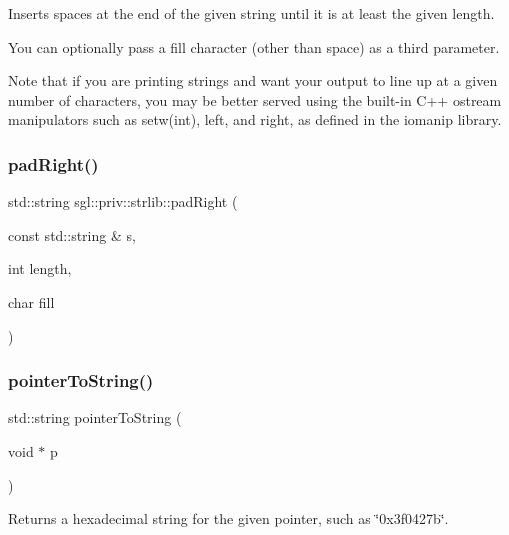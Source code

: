 Inserts spaces at the end of the given string until it is at least the given length. 

You can optionally pass a fill character (other than space) as a third parameter.

Note that if you are printing strings and want your output to line up at a given number of characters, you may be better served using the built-\/in C++ ostream manipulators such as setw(int), left, and right, as defined in the iomanip library. \mbox{\label{namespacesgl_1_1priv_1_1strlib_ac5ec1322098b5170af6c580bd1e01b3b}} 
\subsubsection{\texorpdfstring{pad\+Right()}{padRight()}\hspace{0.1cm}{\footnotesize\ttfamily [2/2]}}
{\footnotesize\ttfamily std\+::string sgl\+::priv\+::strlib\+::pad\+Right (\begin{DoxyParamCaption}\item[{const std\+::string \&}]{s,  }\item[{int}]{length,  }\item[{char}]{fill }\end{DoxyParamCaption})}

\mbox{\label{namespacesgl_1_1priv_1_1strlib_a531909a249cc38a472816a42eb9329e8}} 
\subsubsection{\texorpdfstring{pointer\+To\+String()}{pointerToString()}}
{\footnotesize\ttfamily std\+::string pointer\+To\+String (\begin{DoxyParamCaption}\item[{void $\ast$}]{p }\end{DoxyParamCaption})}



Returns a hexadecimal string for the given pointer, such as \char`\"{}0x3f0427b\char`\"{}. 

